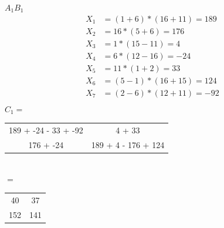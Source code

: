 \documentclass{article}
\begin{document}
\begin{enumerate}
    \begin{multicols}{2}
        \begin{center}
            $A_1B_1$\\
            \begin{align*}
                X_1 &= (1 + 6) * (16 + 11) = 189\\
                X_2 &= 16 * (5 + 6) = 176\\
                X_3 &= 1 * (15-11) = 4 \\
                X_4 &= 6 * (12 - 16) = -24\\
                X_5 &= 11 * (1 + 2) = 33\\
                X_6 &= (5 - 1) * (16 + 15) = 124\\
                X_7 &= (2 - 6) * (12 + 11) = -92\\
            \end{align*}
            $C_1=$
            \begin{tabular}{|c c|}
                \hline
                189 + -24 - 33 + -92 &4 + 33\\
                176 + -24& 189 + 4 - 176 + 124\\
                \hline
            \end{tabular}\\
            $=$
            \begin{tabular}{|c c|}
                \hline
                40&37\\
                152&141\\
                \hline
            \end{tabular}\\
        \end{center}


\end{multicols}
\end{enumerate}
\end{document}
